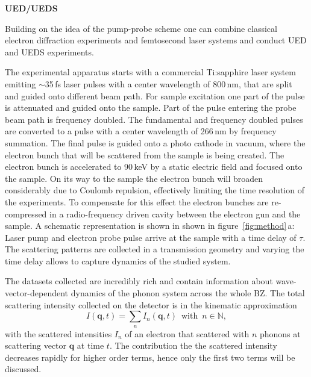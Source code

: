 \textbf{UED/UEDS}

Building on the idea of the pump-probe scheme one can combine classical electron diffraction experiments and femtosecond laser systems and conduct \ac{UED} and \ac{UEDS} experiments.

The experimental apparatus starts with a commercial Ti:sapphire laser system emitting $\sim$35\,fs laser pulses with a center wavelength of 800\,nm, that are split and guided onto different beam path.
For sample excitation one part of the pulse is attenuated and guided onto the sample.
Part of the pulse entering the probe beam path is frequency doubled. The fundamental and frequency doubled pulses are converted to a pulse with a center wavelength of 266\,nm by frequency summation.
The final pulse is guided onto a photo cathode in vacuum, where the electron bunch that will be scattered from the sample is being created.
The electron bunch is accelerated to 90\,keV by a static electric field and focused onto the sample.
On its way to the sample the electron bunch will broaden considerably due to Coulomb repulsion, effectively limiting the time resolution of the experiments.
To compensate for this effect the electron bunches are re-compressed in a radio-frequency driven cavity between the electron gun and the sample.
A schematic representation is shown in shown in figure~\ref{fig:method}\,a:
Laser pump and electron probe pulse arrive at the sample with a time delay of $\tau$.
The scattering patterns are collected in a transmission geometry and varying the time delay allows to capture dynamics of the studied system.

The datasets collected are incredibly rich and contain information about wave-vector-dependent dynamics of the phonon system across the whole \ac{BZ}.
The total scattering intensity collected on the detector is in the kinematic approximation
\begin{equation} I(\mathbf{q},t) = \sum_n I_n(\mathbf{q},t)\enspace\text{with}\enspace n \in\mathbb{N},\label{eq:I}\end{equation}
with the scattered intensities $I_n$ of an electron that scattered with $n$ phonons at scattering vector $\mathbf{q}$ at time $t$.
The contribution the the scattered intensity decreases rapidly for higher order terms, hence only the first two terms will be discussed.

